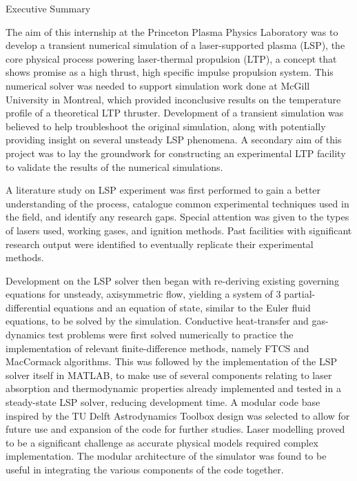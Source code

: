 \begin{plainchp}{Executive Summary}

    The aim of this internship at the Princeton Plasma Physics Laboratory was to develop a transient numerical simulation of a laser-supported plasma (LSP), the core physical process powering laser-thermal pro\-pulsion (LTP), a concept that shows promise as a high thrust, high specific impulse propulsion system. This numerical solver was needed to support simulation work done at McGill University in Montreal, which provided inconclusive results on the temperature profile of a theoretical LTP thruster. Development of a transient simulation was believed to help troubleshoot the original simulation, along with potentially providing insight on several unsteady LSP phenomena. A secondary aim of this project was to lay the groundwork for constructing an experimental LTP facility to validate the results of the numerical simulations.

    A literature study on LSP experiment was first performed to gain a better understanding of the process, catalogue common experimental techniques used in the field, and identify any research gaps. Special attention was given to the types of lasers used, working gases, and ignition methods. Past facilities with significant research output were identified to eventually replicate their experimental methods.

    Development on the LSP solver then began with re-deriving existing governing equations for unsteady, axisymmetric flow, yielding a system of 3 partial-differential equations and an equation of state, similar to the Euler fluid equations, to be solved by the simulation. Conductive heat-transfer and gas-dynamics test problems were first solved numerically to practice the implementation of relevant finite-difference methods, namely FTCS and MacCormack al\-gorithms. This was followed by the implementation of the LSP solver itself in MATLAB, to make use of several components relating to laser absorption and thermodynamic properties already implemented and tested in a steady-state LSP solver, reducing development time. A modular code base inspired by the TU Delft Astrodynamics Toolbox design was selected to allow for future use and expansion of the code for further studies. Laser modelling proved to be a significant challenge as accurate physical models required complex implementation. The modular architecture of the simulator was found to be useful in integrating the various components of the code together.


\end{plainchp}
